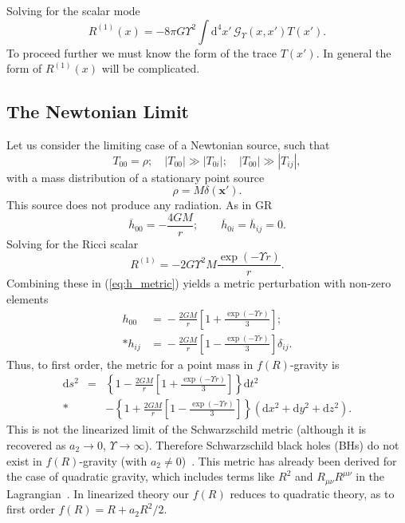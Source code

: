 \documentclass[aps,prd,amsfonts,amssymb,amsmath,nofootinbib,reprint,showpacs]{revtex4-1}
\newcommand{\eqnref}[1]{(\ref{eq:#1})}
\newcommand{\dd}{\ensuremath{\text{d}}}
\begin{document}
Solving for the scalar mode
\begin{equation}
R^{(1)}(x) = -8 \pi G \Upsilon^2 \int \dd^4 x'\, \mathscr{G}_\Upsilon(x, x') T(x').
\end{equation}
To proceed further we must know the form of the trace $T(x')$. In general the form of $R^{(1)}(x)$ will be complicated.

\subsection{The Newtonian Limit}

Let us consider the limiting case of a Newtonian source, such that
\begin{equation}
T_{00} = \rho; \quad |T_{00}| \gg |T_{0i}|; \quad |T_{00}| \gg |T_{ij}|,
\end{equation}
with a mass distribution of a stationary point source
\begin{equation}
\rho = M\delta(\boldsymbol{x'}).
\end{equation}
This source does not produce any radiation. As in GR
\begin{equation}
\overline{h}_{00} = -\frac{4GM}{r}; \qquad \overline{h}_{0i} = \overline{h}_{ij} = 0.
\end{equation}
Solving for the Ricci scalar
\begin{equation}
R^{(1)} = -2 G \Upsilon^2 M \frac{\exp(- \Upsilon r)}{r}.
\end{equation}
Combining these in \eqnref{h_metric} yields a metric perturbation with non-zero elements 
\begin{equation}
\begin{split}
h_{00} & = {} -\frac{2GM}{r}\left[1 + \frac{\exp(- \Upsilon r)}{3}\right]; \\*
h_{ij} & = {} -\frac{2GM}{r}\left[1 - \frac{\exp(- \Upsilon r)}{3}\right]\delta_{ij}.
\end{split}
\end{equation}
Thus, to first order, the metric for a point mass in $f(R)$-gravity is~\cite{Capozziello2007, Capozziello2009a, Naf2010}
\begin{eqnarray}
\dd s^2 & = & \left\{1-\frac{2GM}{r}\left[1 + \frac{\exp(- \Upsilon r)}{3}\right]\right\}\dd t^2 \nonumber \\*
 & & - \left\{1+\frac{2GM}{r}\left[1 - \frac{\exp(- \Upsilon r)}{3}\right]\right\}\left(\dd x^2 + \dd y^2 + \dd z^2\right).
\label{eq:f(R)_Schw}
\end{eqnarray}
This is not the linearized limit of the Schwarzschild metric (although it is recovered as $a_2 \rightarrow 0$, $\Upsilon \rightarrow \infty$). Therefore Schwarzschild black holes (BHs) do not exist in $f(R)$-gravity (with $a_2 \neq 0$)~\cite{Chiba2007a}. This metric has already been derived for the case of quadratic gravity, which includes terms like $R^2$ and $R_{\mu\nu}R^{\mu\nu}$ in the Lagrangian~\cite{Pechlaner1966, Stelle1978, Schmidt1986, Teyssandier1990}. In linearized theory our $f(R)$ reduces to quadratic theory, as to first order $f(R) = R + a_2 R^2/2$.
\end{document}
